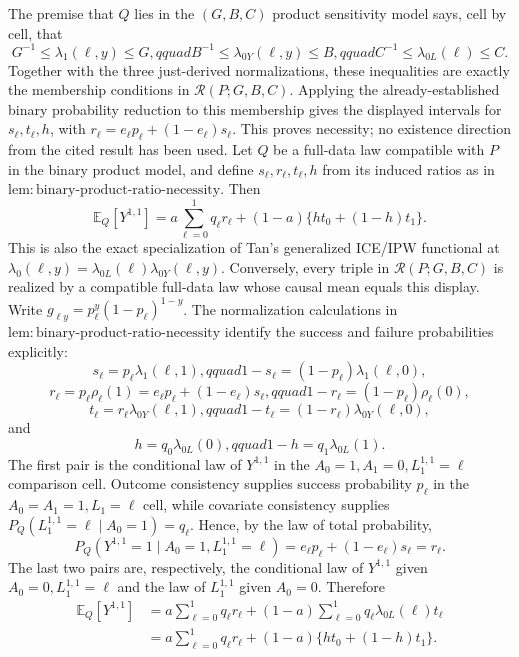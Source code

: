 The premise that \(Q\) lies in the \((G,B,C)\) product sensitivity model says, cell by cell, that
\[
G^{-1}\leq\lambda_1(\ell,y)\leq G,qquad
B^{-1}\leq\lambda_{0Y}(\ell,y)\leq B,qquad
C^{-1}\leq\lambda_{0L}(\ell)\leq C.
\]
Together with the three just-derived normalizations, these inequalities are exactly the membership conditions in \(\mathcal R(P;G,B,C)\). Applying the already-established binary probability reduction to this membership gives the displayed intervals for \(s_\ell,t_\ell,h\), with \(r_\ell=e_\ell p_\ell+(1-e_\ell)s_\ell\). This proves necessity; no existence direction from the cited result has been used.
Let \(Q\) be a full-data law compatible with \(P\) in the binary product model, and define \(s_\ell,r_\ell,t_\ell,h\) from its induced ratios as in \(\mathrm{lem{:}binary\text{-}product\text{-}ratio\text{-}necessity}\). Then
\[
\mathbb E_Q[Y^{1,1}]
=a\sum_{\ell=0}^1q_\ell r_\ell
 +(1-a)\{h t_0+(1-h)t_1\}.
\]
This is also the exact specialization of Tan's generalized ICE/IPW functional at \(\lambda_0(\ell,y)=\lambda_{0L}(\ell)\lambda_{0Y}(\ell,y)\). Conversely, every triple in \(\mathcal R(P;G,B,C)\) is realized by a compatible full-data law whose causal mean equals this display.
Write \(g_{\ell y}=p_\ell^y(1-p_\ell)^{1-y}\). The normalization calculations in \(\mathrm{lem{:}binary\text{-}product\text{-}ratio\text{-}necessity}\) identify the success and failure probabilities explicitly:
\[
s_\ell=p_\ell\lambda_1(\ell,1),qquad
1-s_\ell=(1-p_\ell)\lambda_1(\ell,0),
\]
\[
r_\ell=p_\ell\rho_\ell(1)
=e_\ell p_\ell+(1-e_\ell)s_\ell,qquad
1-r_\ell=(1-p_\ell)\rho_\ell(0),
\]
\[
t_\ell=r_\ell\lambda_{0Y}(\ell,1),qquad
1-t_\ell=(1-r_\ell)\lambda_{0Y}(\ell,0),
\]
and
\[
h=q_0\lambda_{0L}(0),qquad 1-h=q_1\lambda_{0L}(1).
\]
The first pair is the conditional law of \(Y^{1,1}\) in the \(A_0=1,A_1=0,L_1^{1,1}=\ell\) comparison cell. Outcome consistency supplies success probability \(p_\ell\) in the \(A_0=A_1=1,L_1=\ell\) cell, while covariate consistency supplies \(P_Q(L_1^{1,1}=\ell\mid A_0=1)=q_\ell\). Hence, by the law of total probability,
\[
P_Q(Y^{1,1}=1\mid A_0=1,L_1^{1,1}=\ell)
=e_\ell p_\ell+(1-e_\ell)s_\ell=r_\ell.
\]
The last two pairs are, respectively, the conditional law of \(Y^{1,1}\) given \(A_0=0,L_1^{1,1}=\ell\) and the law of \(L_1^{1,1}\) given \(A_0=0\). Therefore
\[
\begin{aligned}
\mathbb E_Q[Y^{1,1}]
&=a\sum_{\ell=0}^1q_\ell r_\ell
 +(1-a)\sum_{\ell=0}^1q_\ell\lambda_{0L}(\ell)t_\ell\\
&=a\sum_{\ell=0}^1q_\ell r_\ell
 +(1-a)\{h t_0+(1-h)t_1\}.
\end{aligned}
\]

